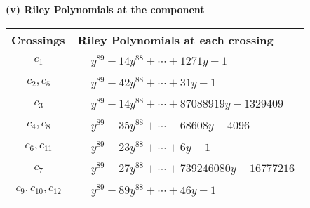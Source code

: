 \documentclass[1p]{elsarticle_modified}
\theoremstyle{definition}
\begin{document}
\newpage\renewcommand{\arraystretch}{1}
\flushleft \textbf{(v) Riley Polynomials at the component}\newline \\
\begin{tabular}{m{50pt}|m{274pt}}
Crossings & \hspace{64pt}Riley Polynomials at each crossing \\
\hline $$\begin{aligned}c_{1}\end{aligned}$$&$\begin{aligned}
&y^{89}+14 y^{88}+\cdots+1271 y-1
\end{aligned}$\\
\hline $$\begin{aligned}c_{2},c_{5}\end{aligned}$$&$\begin{aligned}
&y^{89}+42 y^{88}+\cdots+31 y-1
\end{aligned}$\\
\hline $$\begin{aligned}c_{3}\end{aligned}$$&$\begin{aligned}
&y^{89}-14 y^{88}+\cdots+87088919 y-1329409
\end{aligned}$\\
\hline $$\begin{aligned}c_{4},c_{8}\end{aligned}$$&$\begin{aligned}
&y^{89}+35 y^{88}+\cdots-68608 y-4096
\end{aligned}$\\
\hline $$\begin{aligned}c_{6},c_{11}\end{aligned}$$&$\begin{aligned}
&y^{89}-23 y^{88}+\cdots+6 y-1
\end{aligned}$\\
\hline $$\begin{aligned}c_{7}\end{aligned}$$&$\begin{aligned}
&y^{89}+27 y^{88}+\cdots+739246080 y-16777216
\end{aligned}$\\
\hline $$\begin{aligned}c_{9},c_{10},c_{12}\end{aligned}$$&$\begin{aligned}
&y^{89}+89 y^{88}+\cdots+46 y-1
\end{aligned}$\\
\hline
\end{tabular}\\~\\
\end{document}
